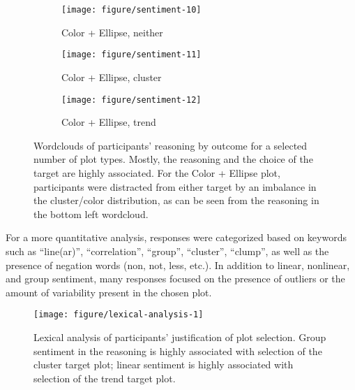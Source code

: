 \documentclass[12pt]{article}\usepackage[]{graphicx}\usepackage[]{color}
\newenvironment{knitrout}{}{} %
\begin{document}
\begin{figure}[ht]
\begin{subfigure}[t]{0.275\linewidth}
  \caption{Color + Ellipse, neither}\vspace{-0.2in}
  \texttt{[image: figure/sentiment-10]}
\end{subfigure}
\begin{subfigure}[t]{0.275\linewidth}
  \caption{Color + Ellipse, cluster}\vspace{-0.2in}
  \texttt{[image: figure/sentiment-11]}
\end{subfigure}
\begin{subfigure}[t]{0.275\linewidth}
  \caption{Color + Ellipse, trend}\vspace{-0.2in}
  \texttt{[image: figure/sentiment-12]}
\end{subfigure}
\caption[Wordclouds of participant responses for selected plot types]{\label{fig:wordles}Wordclouds of participants' reasoning by outcome for a selected number of plot types. Mostly, the reasoning and the choice of the target are highly associated. For the Color + Ellipse plot, participants were distracted from either target by an imbalance in the cluster/color distribution, as can be seen from the reasoning in the bottom left wordcloud.}
\end{figure}
\afterpage{\clearpage}
For a more quantitative analysis, responses were categorized based on keywords such as ``line(ar)'', ``correlation'', ``group'', ``cluster'', ``clump'', as well as the presence of negation words (non, not, less, etc.). In addition to linear, nonlinear, and group sentiment, many responses focused on the presence of outliers or the amount of variability present in the chosen plot. 
\begin{figure}[ht]\centering
\begin{knitrout}
\color{fgcolor}

{\centering \texttt{[image: figure/lexical-analysis-1]} 

}



\end{knitrout}
\caption[Lexical analysis of participant reasoning]{Lexical analysis of participants' justification of plot selection. Group sentiment in the reasoning is highly associated with selection of the cluster target plot; linear sentiment is highly associated with selection of the trend target plot.}\label{fig:lexicalanalysis}
\end{figure}
\end{document}

